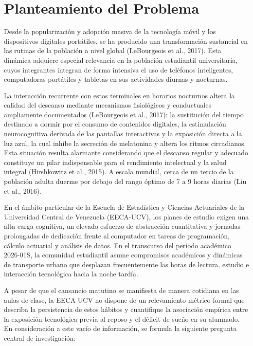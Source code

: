 \documentclass[12pt, letterpaper]{article}
\begin{document}
\section{Planteamiento del Problema}

Desde la popularización y adopción masiva de la tecnología móvil y los dispositivos digitales portátiles, se ha producido una transformación sustancial en las rutinas de la población a nivel global (LeBourgeois et al., 2017). Esta dinámica adquiere especial relevancia en la población estudiantil universitaria, cuyos integrantes integran de forma intensiva el uso de teléfonos inteligentes, computadoras portátiles y tabletas en sus actividades diurnas y nocturnas.

La interacción recurrente con estos terminales en horarios nocturnos altera la calidad del descanso mediante mecanismos fisiológicos y conductuales ampliamente documentados (LeBourgeois et al., 2017): la sustitución del tiempo destinado a dormir por el consumo de contenidos digitales, la estimulación neurocognitiva derivada de las pantallas interactivas y la exposición directa a la luz azul, la cual inhibe la secreción de melatonina y altera los ritmos circadianos. Esta situación resulta alarmante considerando que el descanso regular y adecuado constituye un pilar indispensable para el rendimiento intelectual y la salud integral (Hirshkowitz et al., 2015). A escala mundial, cerca de un tercio de la población adulta duerme por debajo del rango óptimo de 7 a 9 horas diarias (Liu et al., 2016).

En el ámbito particular de la Escuela de Estadística y Ciencias Actuariales de la Universidad Central de Venezuela (EECA-UCV), los planes de estudio exigen una alta carga cognitiva, un elevado esfuerzo de abstracción cuantitativa y jornadas prolongadas de dedicación frente al computador en tareas de programación, cálculo actuarial y análisis de datos. En el transcurso del período académico 2026-01S, la comunidad estudiantil asume compromisos académicos y dinámicas de transporte urbano que desplazan frecuentemente las horas de lectura, estudio e interacción tecnológica hacia la noche tardía.

A pesar de que el cansancio matutino se manifiesta de manera cotidiana en las aulas de clase, la EECA-UCV no dispone de un relevamiento métrico formal que describa la persistencia de estos hábitos y cuantifique la asociación empírica entre la exposición tecnológica previa al reposo y el déficit de sueño en su alumnado. En consideración a este vacío de información, se formula la siguiente pregunta central de investigación:
\end{document}
